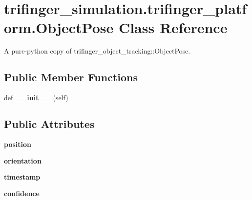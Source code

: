 \hypertarget{classtrifinger__simulation_1_1trifinger__platform_1_1ObjectPose}{}\section{trifinger\+\_\+simulation.\+trifinger\+\_\+platform.\+Object\+Pose Class Reference}
\label{classtrifinger__simulation_1_1trifinger__platform_1_1ObjectPose}


A pure-\/python copy of trifinger\+\_\+object\+\_\+tracking\+::\+Object\+Pose.  


\subsection*{Public Member Functions}
\begin{DoxyCompactItemize}
\item 
\mbox{\label{classtrifinger__simulation_1_1trifinger__platform_1_1ObjectPose_a6e656d77abd19c10fe5756428c17b539}} 
def {\bfseries \+\_\+\+\_\+init\+\_\+\+\_\+} (self)
\end{DoxyCompactItemize}
\subsection*{Public Attributes}
\begin{DoxyCompactItemize}
\item 
\mbox{\label{classtrifinger__simulation_1_1trifinger__platform_1_1ObjectPose_a2c851f3dc089f154e5f3011b57b359c2}} 
{\bfseries position}
\item 
\mbox{\label{classtrifinger__simulation_1_1trifinger__platform_1_1ObjectPose_a70f1fa5dbfc98a39dc4187b88d2b6de7}} 
{\bfseries orientation}
\item 
\mbox{\label{classtrifinger__simulation_1_1trifinger__platform_1_1ObjectPose_a78694250e5ee0e029a8c69854fecc14f}} 
{\bfseries timestamp}
\item 
\mbox{\label{classtrifinger__simulation_1_1trifinger__platform_1_1ObjectPose_a38f2a006ba60ecf8ff9c231908e49788}} 
{\bfseries confidence}
\end{DoxyCompactItemize}
